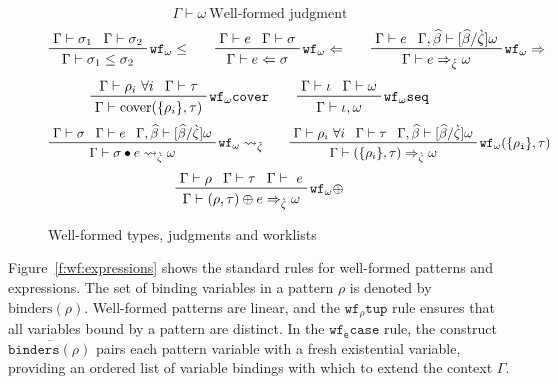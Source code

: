 \documentclass[letterpaper]{article}
\newcommand{\etv}{{\widehat{\beta}}}  %
\newcommand{\stv}{{\grave{\zeta}}}    %
\begin{document}
\begin{figure}
  $$ \boxed{\Gamma\vdash\omega}\ \textrm{Well-formed judgment} $$
  $$ \prftree[r]{$\mathtt{wf_\omega \leq}$}
             {\prfassumption{\Gamma\vdash\sigma_1}}{\prfassumption{\Gamma\vdash\sigma_2}}
             {\Gamma\vdash\sigma_1\leq\sigma_2}\qquad
     \prftree[r]{$\mathtt{wf_\omega\Leftarrow}$}
             {\prfassumption{\Gamma\vdash e}}{\prfassumption{\Gamma\vdash\sigma}}
             {\Gamma\vdash e\Leftarrow\sigma}\qquad
     \prftree[r]{$\mathtt{wf_\omega\Rightarrow}$}
             {\prfassumption{\Gamma\vdash e}}{\prfassumption{\Gamma,\etv\vdash[\etv/\stv]\omega}}
             {\Gamma\vdash e\Rightarrow_\stv\omega} $$
  $$ \prftree[r]{$\mathtt{wf_\omega cover}$}
             {\prfassumption{\Gamma\vdash\rho_i\ \forall i}}
             {\prfassumption{\Gamma\vdash\tau}}
             {\Gamma\vdash\mathrm{cover}(\{\rho_i\}, \tau)}\qquad
     \prftree[r]{$\mathtt{wf_\omega seq}$}
             {\prfassumption{\Gamma\vdash\iota}}
             {\prfassumption{\Gamma\vdash\omega}}
             {\Gamma\vdash\iota,\omega} $$
  $$ \prftree[r]{$\mathtt{wf_\omega \rightsquigarrow_\stv}$}
             {\prfassumption{\Gamma\vdash\sigma}}{\prfassumption{\Gamma\vdash e}}
             {\prfassumption{\Gamma,\etv\vdash[\etv/\stv]\omega}}
             {\Gamma\vdash\sigma\bullet e\rightsquigarrow_\stv\omega}\qquad
     \prftree[r]{$\mathtt{wf_\omega (\{\rho_i\},\tau)}$}
             {\prfassumption{\Gamma\vdash\rho_i\ \forall i}}
             {\prfassumption{\Gamma\vdash\tau}}
             {\prfassumption{\Gamma,\etv\vdash[\etv/\stv]\omega}}
             {\Gamma\vdash(\{\rho_i\},\tau)\Rightarrow_\stv\omega} $$
  $$ \prftree[r]{$\mathtt{wf_\omega \oplus}$}
             {\prfassumption{\Gamma\vdash\rho}}
             {\prfassumption{\Gamma\vdash\tau}}
             {\prfassumption{\Gamma\vdash\ e}}
             {\Gamma\vdash(\rho,\tau)\oplus e\Rightarrow_\stv\omega} $$
  \caption{Well-formed types, judgments and worklists}
  \label{f:ts:wf}
\end{figure}

Figure~\ref{f:wf:expressions} shows the standard rules for well-formed
patterns and expressions.  The set of binding variables in a pattern
$\rho$ is denoted by $\mathrm{binders}(\rho)$.  Well-formed patterns
are linear, and the $\mathtt{wf_\rho tup}$ rule ensures that all
variables bound by a pattern are distinct.  In the $\mathtt{wf_e
  case}$ rule, the construct $\overline{\mathtt{binders}(\rho)}$ pairs
each pattern variable with a fresh existential variable, providing an
ordered list of variable bindings with which to extend the context
$\Gamma$.
\end{document}
